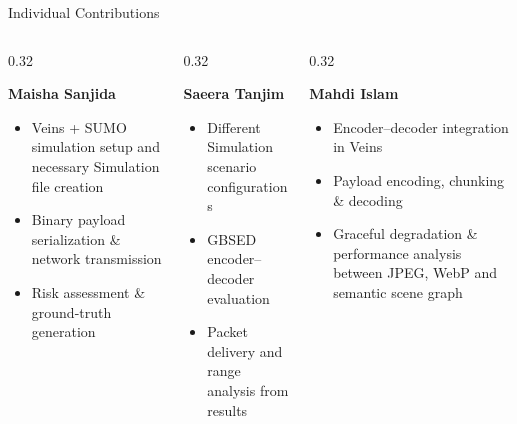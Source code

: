 \documentclass[aspectratio=169]{beamer}
\begin{document}
\begin{frame}{Individual Contributions}

\small

\begin{columns}[T]

\begin{column}{0.32\textwidth}

\begin{center}
\textbf{Maisha Sanjida}
\end{center}

\begin{itemize}
\item Veins + SUMO simulation setup and necessary Simulation file creation
\item Binary payload serialization \& network transmission
\item Risk assessment \& ground-truth generation
\end{itemize}

\end{column}

\begin{column}{0.32\textwidth}

\begin{center}
\textbf{Saeera Tanjim}
\end{center}

\begin{itemize}
\item Different Simulation scenario configurations
\item GBSED encoder--decoder evaluation
\item Packet delivery and range analysis from results
\end{itemize}

\end{column}

\begin{column}{0.32\textwidth}

\begin{center}
\textbf{Mahdi Islam}
\end{center}

\begin{itemize}
\item Encoder--decoder integration in Veins
\item Payload encoding, chunking \& decoding
\item Graceful degradation \& performance analysis between JPEG, WebP and semantic scene graph
\end{itemize}

\end{column}

\end{columns}

\end{frame}
\end{document}
